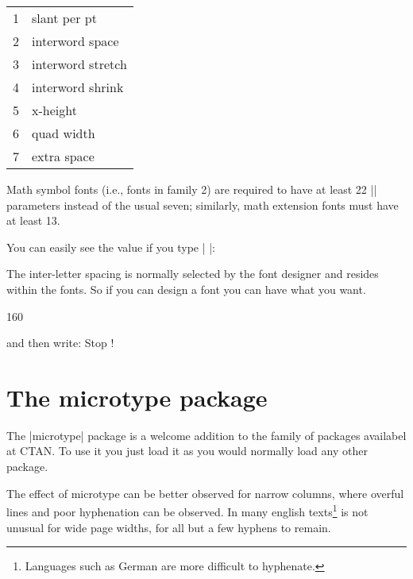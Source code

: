 \begin{multicols}{2}
\begin{tabular}{ll}
    1 &slant per pt\\
    2 &interword space\\
    3 &interword stretch\\
    4 &interword shrink \\
    5 &x-height \\
    6 &quad width \\
    7 &extra space \\
\end{tabular}

Math symbol fonts (i.e., fonts in family 2) are required to have at least
22 |\fontdimen| parameters instead of the usual seven; similarly, math extension
fonts must have at least 13.

You can easily see the value if you type | \the{}\font|:

     \the{}\font

The inter-letter spacing is normally selected by the font designer and resides within the fonts. So if you can design a font you can have what you want.



{  \the{}\font }\the{}\font

\font

{ 160 }

and then write:
Stop !

\section*{The microtype package}

The |microtype| package is a welcome addition to the family of packages availabel at CTAN. To use it you 
just load it as you would normally load any other package.


The effect of microtype can be better observed for narrow columns, where overful lines and poor hyphenation can be observed. In many english texts\footnote{Languages such as German are more difficult to hyphenate.} is not unusual for wide page widths, for all but a few hyphens to remain.


\end{multicols}
